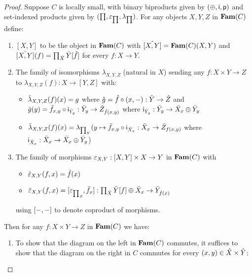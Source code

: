 \begin{proof}
Suppose $C$ is locally small, with binary biproducts given by $(\oplus,\mathsf{i},\mathsf{p})$ and set-indexed products
given by $(\prod,\varepsilon_{\prod},\lambda_{\prod})$. For any objects $X, Y, Z$ in $\mathbf{Fam}(C)$ define:

\begin{enumerate}
\item $[X, Y]$ to be the object in $\mathbf{Fam}(C)$ with $\hat{[X,Y]} = \mathbf{Fam}(C)(X,Y)$ and $\bar{[X, Y]}(f) =
\prod_{\hat{X}}\bar{Y}[\hat{f}]$ for every $f: X \to Y$.
\item The family of isomorphisms $\lambda_{X,Y,Z}$ (natural in $X$) sending any $f: X \times Y \to Z$ to
$\lambda_{X,Y,Z}(f): X \to [Y, Z]$ with:
\begin{itemize}
\item $\hat{\lambda}_{X,Y,Z}(f)(x) = g$ where $\hat{g} = \hat{f} \circ (x, -): \hat{Y} \to \hat{Z}$ and
$\bar{g}(y) = \bar{f}_{x,y} \circ \mathsf{i}_{\bar{Y}_y}: \bar{Y}_y \to \bar{Z}_{\hat{f}(x, y)}$ where
$\mathsf{i}_{\bar{Y}_y}: \bar{Y}_y \to \bar{X}_x \oplus \bar{Y}_y$
\item $\bar{\lambda}_{X,Y,Z}(f)(x) = \lambda_{\prod_{\hat{Y}}}(y \mapsto \bar{f}_{x, y} \circ
\mathsf{i}_{\bar{X}_x}: \bar{X}_x \to \bar{Z}_{f(x,y)}$ where $\mathsf{i}_{\bar{X}_x}: \bar{X}_x \to \bar{X}_x
\oplus \bar{Y}_y$)
\end{itemize}
\item The family of morphisms $\varepsilon_{X,Y}: [X, Y] \times X \to Y$ in $\mathbf{Fam}(C)$ with
\begin{itemize}
\item $\hat{\varepsilon}_{X,Y}(f, x) = \hat{f}(x)$
\item $\bar{\varepsilon}_{X,Y}(f, x) = [{\varepsilon_{\prod}}_x, \bar{f}_x]:
\prod_{\hat{X}}\bar{Y}[f] \oplus \bar{X}_x \to \bar{Y}_{\hat{f}(x)}$
\end{itemize}
using $[-, -]$ to denote coproduct of morphisms.
\end{enumerate}
Then for any $f: X \times Y \to Z$ in $\mathbf{Fam}(C)$ we have:
\begin{enumerate}
\item To show that the diagram on the left in $\mathbf{Fam}(C)$ commutes, it suffices to show that the diagram on the
right in $C$ commutes for every $(x, y) \in \hat{X} \times \hat{Y}$:


\end{enumerate}
\end{proof}
